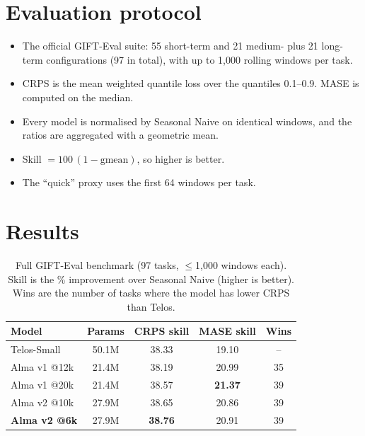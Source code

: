 \documentclass[10pt,twocolumn]{extarticle}
\newcommand{\best}[1]{\textbf{#1}}
\begin{document}
\section{Evaluation protocol}
\begin{itemize}
\item The official GIFT-Eval suite: 55 short-term and 21 medium- plus 21 long-term
configurations (97 in total), with up to 1{,}000 rolling windows per task.
\item CRPS is the mean weighted quantile loss over the quantiles 0.1--0.9. MASE is
computed on the median.
\item Every model is normalised by Seasonal Naive on identical windows, and the
ratios are aggregated with a geometric mean.
\item Skill $=100\,(1-\text{gmean})$, so higher is better.
\item The ``quick'' proxy uses the first 64 windows per task.
\end{itemize}

\section{Results}
\begin{table}[t]
\centering\small
\caption{Full GIFT-Eval benchmark (97 tasks, $\le$1{,}000 windows each). Skill is
the \% improvement over Seasonal Naive (higher is better). Wins are the number of
tasks where the model has lower CRPS than Telos.}
\label{tab:main}
\setlength{\tabcolsep}{3.2pt}
\begin{tabular}{@{}lcccc@{}}
\toprule
Model & Params & CRPS skill & MASE skill & Wins \\
\midrule
Telos-Small            & 50.1M & 38.33 & 19.10 & -- \\
Alma v1 @12k           & 21.4M & 38.19 & 20.99 & 35 \\
Alma v1 @20k           & 21.4M & 38.57 & \best{21.37} & 39 \\
Alma v2 @10k           & 27.9M & 38.65 & 20.86 & 39 \\
\textbf{Alma v2 @6k}   & 27.9M & \best{38.76} & 20.91 & 39 \\
\bottomrule
\end{tabular}
\end{table}
\end{document}
